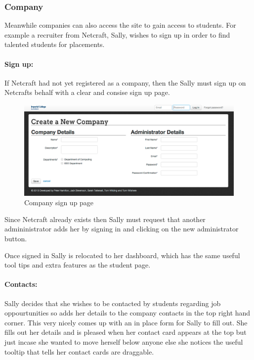 \subsubsection{Company}
Meanwhile companies can also access the site to gain access to students. For example a recruiter from Netcraft, Sally, wishes to sign up in order to find talented students for placements.
  \paragraph{Sign up:}
    If Netcraft had not yet registered as a company, then the Sally must sign up on Netcrafts behalf with a clear and consise sign up page.

    \begin{figure}[H]\centering
    \includegraphics[scale=0.3]{images/user_experiences/company/company_signup}
    \caption{Company sign up page}
    \end{figure}

    Since Netcraft already exists then Sally must request that another admininistrator adds her by signing in and clicking on the new administrator button.

    Once signed in Sally is relocated to her dashboard, which has the same useful tool tips and extra features as the student page.

  \paragraph{Contacts:}
    Sally decides that she wishes to be contacted by students regarding job oppourtunities so adds her details to the company contacts in the top right hand corner. This very nicely comes up with an in place form for Sally to fill out.
    She fills out her details and is pleased when her contact card appears at the top but just incase she wanted to move herself below anyone else she notices the useful tooltip that tells her contact cards are draggable.

